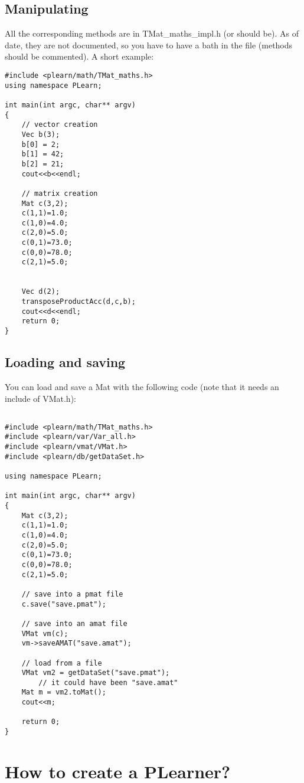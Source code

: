 \documentclass[11pt]{book}
\begin{document}
\subsection{Manipulating}
All the corresponding methods are in TMat\_maths\_impl.h (or should be). As of 
date, they are not documented, so you have to have a bath in the file (methods 
should be commented). A short example:

\begin{verbatim}
#include <plearn/math/TMat_maths.h>
using namespace PLearn;

int main(int argc, char** argv)
{
    // vector creation
    Vec b(3);
    b[0] = 2;
    b[1] = 42;
    b[2] = 21;
    cout<<b<<endl;

    // matrix creation
    Mat c(3,2);
    c(1,1)=1.0;
    c(1,0)=4.0;
    c(2,0)=5.0;
    c(0,1)=73.0;
    c(0,0)=78.0;
    c(2,1)=5.0;


    Vec d(2);
    transposeProductAcc(d,c,b);
    cout<<d<<endl;
    return 0;
}
\end{verbatim}

\subsection{Loading and saving}
You can load and save a Mat with the following code (note that it needs an 
include of VMat.h):
\begin{verbatim}

#include <plearn/math/TMat_maths.h>
#include <plearn/var/Var_all.h>
#include <plearn/vmat/VMat.h>
#include <plearn/db/getDataSet.h>

using namespace PLearn;

int main(int argc, char** argv)
{
    Mat c(3,2);
    c(1,1)=1.0;
    c(1,0)=4.0;
    c(2,0)=5.0;
    c(0,1)=73.0;
    c(0,0)=78.0;
    c(2,1)=5.0;

    // save into a pmat file
    c.save("save.pmat");

    // save into an amat file
    VMat vm(c);
    vm->saveAMAT("save.amat");

    // load from a file
    VMat vm2 = getDataSet("save.pmat");
        // it could have been "save.amat"
    Mat m = vm2.toMat();
    cout<<m;

    return 0;
}

\end{verbatim}



\section{How to create a PLearner?}
\end{document}
